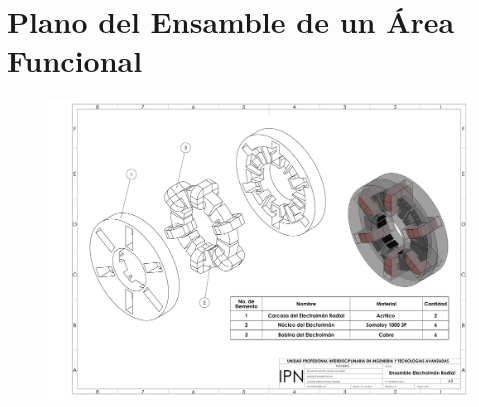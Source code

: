 \chapter{Plano del Ensamble de un \'Area Funcional}

\newpage

\begin{figure}[t]
\centering
	\includegraphics[width=\textheight, height=\textwidth, angle=270]{images/Apendices/Plano_EIR}
\end{figure}